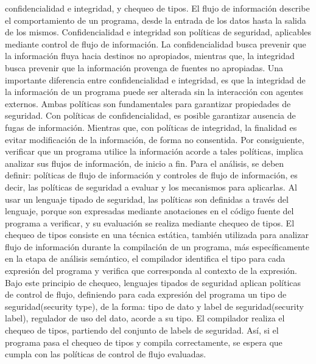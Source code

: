 confidencialidad e integridad, y chequeo de tipos.\newline 
El flujo de información describe el comportamiento de un programa, desde la
entrada de los datos hasta la salida de los mismos.\newline 
Confidencialidad e integridad son políticas de seguridad, aplicables mediante
control de flujo de información. La confidencialidad busca prevenir que la
información fluya hacia destinos no apropiados, mientras que, la integridad
busca prevenir que la información provenga de fuentes no apropiadas. Una
importante diferencia entre confidencialidad e integridad, es que la integridad
de la información de un programa puede ser alterada sin la interacción con
agentes externos.\newline %
Ambas políticas son fundamentales para garantizar propiedades de seguridad. Con
políticas de confidencialidad, es posible garantizar ausencia de fugas de
información. Mientras que, con políticas de integridad, la finalidad es evitar
modificación de la información, de forma no consentida.\newline
Por consiguiente, verificar que un programa utilice la información acorde a
tales políticas, implica analizar sus flujos de información, de inicio a fin.
Para el análisis, se deben definir: políticas de flujo de información y
controles de flujo de información, es decir, las políticas de seguridad a
evaluar y los mecanismos para aplicarlas.\newline 
Al usar un lenguaje tipado de seguridad, las políticas son definidas a través
del lenguaje, porque son expresadas mediante anotaciones en el código fuente del
programa a verificar, y su evaluación se realiza mediante chequeo de tipos. El
chequeo de tipos consiste en una técnica estática, también utilizada para
analizar flujo de información durante la compilación de un programa, más
específicamente en la etapa de análisis semántico, el compilador identifica el
tipo para cada expresión del programa y verifica que corresponda al contexto de
la expresión.
Bajo este principio de chequeo, lenguajes tipados de seguridad aplican
políticas de control de flujo, definiendo para cada expresión del programa un
tipo de seguridad(security type), de la forma:  tipo de dato y label de
seguridad(security label), regulador de uso del dato, acorde a su tipo. El
compilador realiza el chequeo de tipos, partiendo del conjunto de labels de
seguridad. Así, si el programa pasa el chequeo de tipos y compila correctamente,
se espera que cumpla con las políticas de control de flujo evaluadas.
